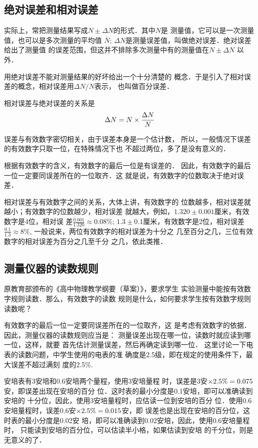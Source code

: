 \subsection{绝对误差和相对误差}
实际上，常把测量结果写成$N\pm\Delta N$的形式．其中$N$是
测量值，它可以是一次测量值，也可以是多次测量的平均值
$\overline N$; $\Delta N$是测量误差值，叫做绝对误差．绝对误差给出了测量值
的误差范围，但这并不排除多次测量中有的测量值在$N\pm\Delta N$
以外．

用绝对误差不能对测量结果的好坏给出一个十分清楚的
概念．于是引入了相对误差的概念，相对误差用$\Delta N/N$表示，
也叫做百分误差．

相对误差与绝对误差的关系是
\[\Delta N=N\times \frac{\Delta N}{N}\]

误差与有效数字密切相关，由于误差本身是一个估计数，
所以，一般情况下误差的有效数字只取一位，在特殊情况下也
不超过两位，多了是没有意义的．

根据有效数字的含义，有效数字的最后一位是有误差的．
因此，有效数字的最后一位一定要同误差所在的一位取齐．这
就是说，有效数字的位数取决于绝对误差．

相对误差与有效数字之间的关系，大体上讲，有效数字的
位数越多，相对误差就越小；有效数字的位数越少，相对误差
就越大，例如，$1.320\pm 0.001$厘米，有效数字是4位，相对误
差$\frac{0.001}{1.320}\approx 0.08\%$; $1.3\pm 0.1$厘米，有效数字是2位，相对误差$\frac{0.1}{1.3}\approx 8\%$, 一般说来，两位有效数字的相对误差为十分之
几至百分之几，三位有效数字的相对误差为百分之几至千分
之几，依此类推．

\subsection{测量仪器的读数规则}
原教育部颁布的《高中物理教学纲要（草案）》，要求学生
实验测量中能按有效数字规则读数．那么，有效数字的读数
规则是什么，如何要求学生按有效数字规则读数呢？

有效数字的最后一位一定要同误差所在的一位取齐，这
是考虑有效数字的依据．因此，测量仪器的读数规则应当是：
测量误差出现在哪一位，读数时就应读到哪一位，这样，就要
首先估计测量误差，然后再确定读到哪一位．
这里讨论一下电表的读数问题，中学生使用的电表的准
确度是2.5级，即在规定的使用条件下，最大误差不超过满刻
度的2.5\%.

安培表有3安培和0.6安培两个量程，使用3安培量程
时，误差是3安$\times2.5\%=0.075$安，即误差出现在安培的百分
位．这时表的最小分度是0.1安培，即可以准确读到安培的
十分位，因此，使用3安培量程时，应估读一位到安培的百分
位．使用0.6安培量程时，误差0.6安$\times2.5\%=0.015$安，即
误差也是出现在安培的百分位，这时表的最小分度是0.02安
培，即可以准确读到0.02安培，因此，使用0.6安培量程时，
只能读到安培的百分位，可以估读半小格，如果估读到安培
的千分位，则是无意义的了．


